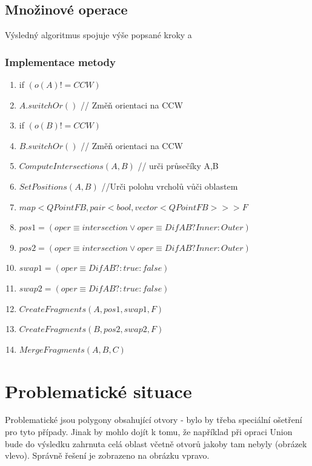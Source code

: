 \documentclass[a4paper, 12pt]{article}
\begin{document}
\clearpage

\subsection{Množinové operace}
Výsledný algoritmus spojuje výše popsané kroky a 
\subsubsection{Implementace metody}
\begin{enumerate}
	\item if $ (o(A) != CCW) $
	\item \hspace{1cm} $ A.switchOr() $ // Změň orientaci na CCW
	\item if $ (o(B) != CCW) $
	\item \hspace{1cm} $ B.switchOr() $ // Změň orientaci na CCW
	\item $ ComputeIntersections(A,B) $ // urči průsečíky A,B
	\item $ SetPositions (A,B) $ //Urči polohu vrcholů vůči oblastem
	\item $map <QPointFB, pair <bool, vector<QPointFB>>> F$
	\item $ pos1 = (oper \equiv intersection \vee oper \equiv DifAB?Inner:Outer) $
	\item $ pos2 = (oper \equiv intersection \vee oper \equiv DifAB?Inner:Outer) $
	\item $ swap1 = (oper \equiv DifAB? : true : false) $
	\item $ swap2 = (oper \equiv DifAB? : true : false) $
	\item $ CreateFragments (A, pos1, swap1, F) $
	\item $ CreateFragments (B, pos2, swap2, F) $
	\item $ MergeFragments (A,B,C) $
\end{enumerate}

\clearpage

\section{Problematické situace}

Problematické jsou polygony obsahující otvory - bylo by třeba speciální ošetření pro tyto případy. Jinak by mohlo dojít k tomu, že například při opraci Union bude do výsledku zahrnuta celá oblast včetně otvorů jakoby tam nebyly (obrázek vlevo). Správně řešení je zobrazeno na obrázku vpravo.\\
\end{document}
